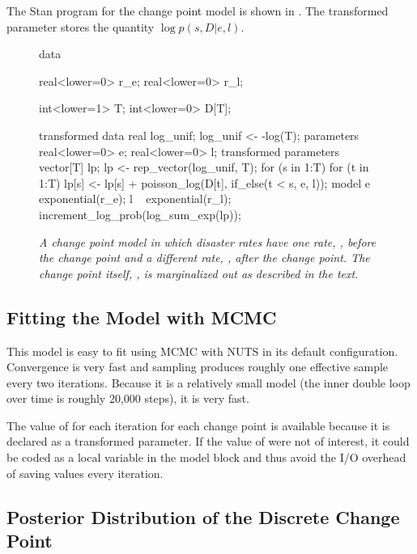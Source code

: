 The Stan program for the change point model is shown in
.  The transformed parameter
 stores the quantity $\log p(s,D|e,l)$.
%
\begin{figure}
\begin{stancode}
data {
  real<lower=0> r_e;
  real<lower=0> r_l;

  int<lower=1> T;
  int<lower=0> D[T];
}
transformed data {
  real log_unif;
  log_unif <- -log(T);
}
parameters {
  real<lower=0> e;
  real<lower=0> l;
}
transformed parameters {
  vector[T] lp;
  lp <- rep_vector(log_unif, T);
  for (s in 1:T)
    for (t in 1:T)
      lp[s] <- lp[s] + poisson_log(D[t], if_else(t < s, e, l));
}
model {
  e ~ exponential(r_e);
  l ~ exponential(r_l);
  increment_log_prob(log_sum_exp(lp));
}    
\end{stancode}
\vspace*{-6pt}
\caption{\small\it A change point model in which disaster rates
   have one rate, , before the change point and a
  different rate, , after the change point.  The change point
  itself, , is marginalized out as described in the
  text.}\label{change-point-model.figure}
\end{figure}

\subsection{Fitting the Model with MCMC}

This model is easy to fit using MCMC with NUTS in its default
configuration.  Convergence is very fast and sampling produces roughly
one effective sample every two iterations.  Because it is a relatively
small model (the inner double loop over time is roughly 20,000 steps),
it is very fast.

The value of  for each iteration for each change point is
available because it is declared as a transformed parameter.  If the
value of  were not of interest, it could be coded as a local
variable in the model block and thus avoid the I/O overhead of saving
values every iteration.

\subsection{Posterior Distribution of the Discrete Change Point}

